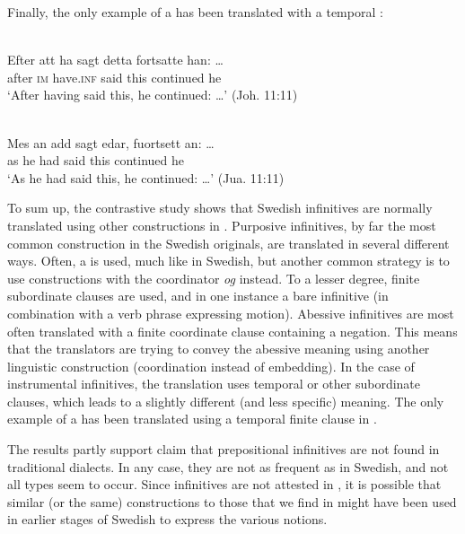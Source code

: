 \documentclass[output=paper]{langscibook}
\begin{document}
Finally, the only example of a  has been translated with a temporal : 


\ea
\label{ex:kalm:30}
\ea {}\label{ex:kalm:30a}\\ 
\gll Efter att ha sagt detta fortsatte han: …\\
 after \textsc{im} have.\textsc{inf} said this continued he\\
\glt ‘After having said this, he continued: …’ (Joh. 11:11)

\ex {}\label{ex:kalm:30b}\\
\gll Mes an add sagt edar, fuortsett an: …\\
 as he had said this continued he\\
\glt ‘As he had said this, he continued: …’ (Jua. 11:11)
\z
\z 


To sum up, the contrastive study shows that Swedish  infinitives are normally translated using other constructions in . Purposive infinitives, by far the most common construction in the Swedish originals, are translated in several different ways. Often, a  is used, much like in Swedish, but another common strategy is to use constructions with the coordinator \textit{og} instead. To a lesser degree, finite subordinate clauses are used, and in one instance a bare infinitive (in combination with a verb phrase expressing motion). Abessive infinitives are most often translated with a finite coordinate clause containing a negation. This means that the translators are trying to convey the abessive meaning using another linguistic construction (coordination instead of embedding). In the case of instrumental infinitives, the translation uses temporal or other subordinate clauses, which leads to a slightly different (and less specific) meaning. The only example of a  has been translated using a temporal finite clause in . 

The results partly support  claim that prepositional infinitives are not found in traditional dialects. In any case, they are not as frequent as in Swedish, and not all types seem to occur. Since  infinitives are not attested in , it is possible that similar (or the same) constructions to those that we find in  might have been used in earlier stages of Swedish to express the various  notions. 
\end{document}
